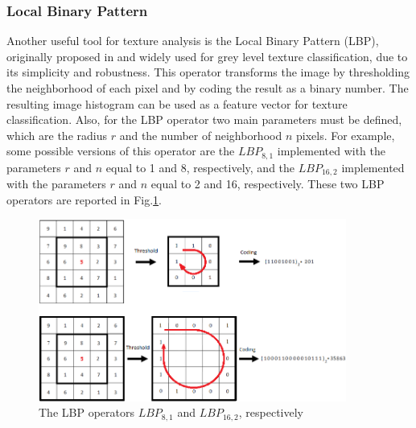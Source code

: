 \subsubsection{Local Binary Pattern} \label{LBP}
Another useful tool for texture analysis is the Local Binary Pattern (\acs{LBP}), originally proposed in \cite{Ojala} and widely used for grey level texture classification, due to its simplicity and robustness. This operator transforms the image by thresholding the neighborhood of each pixel and by coding the result as a binary number. The resulting image histogram can be used as a feature vector for texture classification. Also, for the LBP operator two main parameters must be defined, which are the radius $r$ and the number of neighborhood $n$ pixels. For example, some possible versions of this operator are the $LBP_{8,1}$ implemented with the parameters $r$ and $n$ equal to 1 and 8, respectively, and the  $LBP_{16,2}$ implemented with the parameters $r$ and $n$ equal to 2 and 16, respectively. These two LBP operators are reported in Fig.\ref{fig:LBP}.

\begin{figure}[!t]
	\centering
	\includegraphics[width=0.90\textwidth]{images/LBP}
	\caption[LBP operators.]{\label{fig:LBP}The LBP operators $LBP_{8,1}$  and $LBP_{16,2}$, respectively  }
\end{figure}

